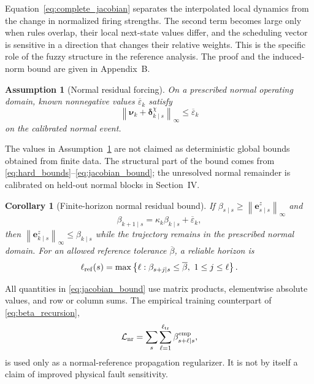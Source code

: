 \documentclass[journal]{IEEEtran}
\newtheorem{assumption}{Assumption}
\newtheorem{corollary}{Corollary}
\newcommand{\norm}[1]{\left\lVert #1\right\rVert}
\newcommand{\1}{\bm 1}
\begin{document}
Equation~\eqref{eq:complete_jacobian} separates the interpolated local dynamics
from the change in normalized firing strengths. The second term becomes large
only when rules overlap, their local next-state values differ, and the
scheduling vector is sensitive in a direction that changes their relative
weights. This is the specific role of the fuzzy structure in the reference
analysis. The proof and the induced-norm bound are given in Appendix~B.

\begin{assumption}[Normal residual forcing]
\label{ass:normal}
On a prescribed normal operating domain, known nonnegative values
$\overline{\varepsilon}_k$ satisfy
\begin{equation}
\norm{\bm\nu_k+\bm\delta_{k\mid s}^{\chi}}_\infty
\leq\overline{\varepsilon}_k
\label{eq:forcing_bound}
\end{equation}
on the calibrated normal event.
\end{assumption}

The values in Assumption~\ref{ass:normal} are not claimed as deterministic
global bounds obtained from finite data. The structural part of the bound
comes from \eqref{eq:hard_bounds}--\eqref{eq:jacobian_bound}; the unresolved
normal remainder is calibrated on held-out normal blocks in Section~IV.

\begin{corollary}[Finite-horizon normal residual bound]
\label{cor:bound}
If $\beta_{s\mid s}\geq\norm{\bm e_{s\mid s}^z}_\infty$ and
\begin{equation}
\beta_{k+1\mid s}=\kappa_k\beta_{k\mid s}
+\overline{\varepsilon}_k,
\label{eq:beta_recursion}
\end{equation}
then $\norm{\bm e_{k\mid s}^z}_\infty\leq\beta_{k\mid s}$ while the trajectory
remains in the prescribed normal domain. For an allowed reference tolerance
$\overline{\beta}$, a reliable horizon is
\begin{equation}
\ell_{\rm ref}(s)=
\max\left\{\ell:\beta_{s+j\mid s}\leq\overline{\beta},
\ 1\leq j\leq\ell\right\}.
\label{eq:reliable_horizon}
\end{equation}
\end{corollary}

All quantities in \eqref{eq:jacobian_bound} use matrix products, elementwise
absolute values, and row or column sums. The empirical training counterpart
of \eqref{eq:beta_recursion},
\begin{equation}
\mathcal L_{\rm nr}=
\sum_s\sum_{\ell=1}^{\ell_{\rm tr}}
\beta_{s+\ell\mid s}^{\rm emp},
\label{eq:normal_propagation_loss}
\end{equation}
is used only as a normal-reference propagation regularizer. It is not by
itself a claim of improved physical fault sensitivity.
\end{document}
